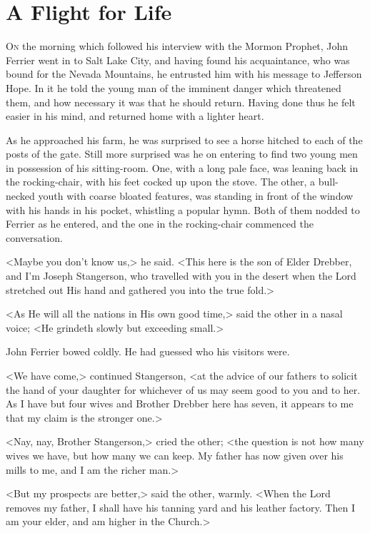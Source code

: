 \chapter{A Flight for Life}
\lettrine{O}{n} the morning which followed his interview with the Mormon Prophet, John Ferrier went in to Salt Lake City, and having found his acquaintance, who was bound for the Nevada Mountains, he entrusted him with his message to Jefferson Hope. In it he told the young man of the imminent danger which threatened them, and how necessary it was that he should return. Having done thus he felt easier in his mind, and returned home with a lighter heart.

As he approached his farm, he was surprised to see a horse hitched to each of the posts of the gate. Still more surprised was he on entering to find two young men in possession of his sitting-room. One, with a long pale face, was leaning back in the rocking-chair, with his feet cocked up upon the stove. The other, a bull-necked youth with coarse bloated features, was standing in front of the window with his hands in his pocket, whistling a popular hymn. Both of them nodded to Ferrier as he entered, and the one in the rocking-chair commenced the conversation.

<Maybe you don't know us,> he said. <This here is the son of Elder Drebber, and I'm Joseph Stangerson, who travelled with you in the desert when the Lord stretched out His hand and gathered you into the true fold.>

<As He will all the nations in His own good time,> said the other in a nasal voice; <He grindeth slowly but exceeding small.>

John Ferrier bowed coldly. He had guessed who his visitors were.

<We have come,> continued Stangerson, <at the advice of our fathers to solicit the hand of your daughter for whichever of us may seem good to you and to her. As I have but four wives and Brother Drebber here has seven, it appears to me that my claim is the stronger one.>

<Nay, nay, Brother Stangerson,> cried the other; <the question is not how many wives we have, but how many we can keep. My father has now given over his mills to me, and I am the richer man.>

<But my prospects are better,> said the other, warmly. <When the Lord removes my father, I shall have his tanning yard and his leather factory. Then I am your elder, and am higher in the Church.>

